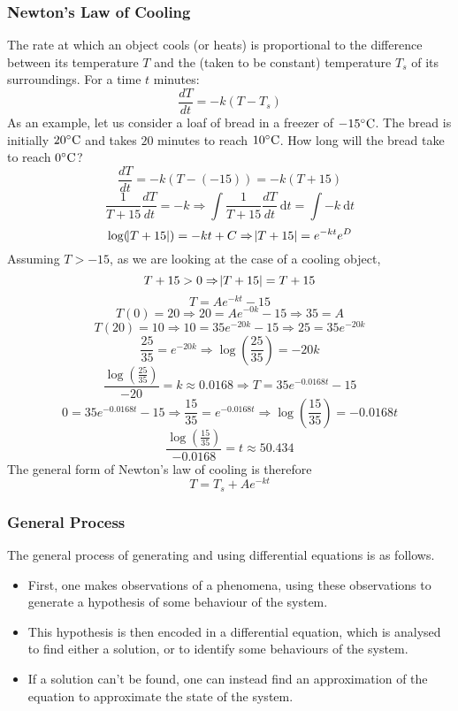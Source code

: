\documentclass[12pt]{report}
\begin{document}
\begin{flushleft}
\subsubsection*{Newton's Law of Cooling}
The rate at which an object cools (or heats) is proportional to the difference
between its temperature \(T\) and the (taken to be constant) temperature 
\(T_s\) of its surroundings. For a time \(t\) minutes:
\[\frac{dT}{dt} = -k(T - T_s)\]
As an example, let us consider a loaf of bread in a freezer of 
\(-15\degree\mathrm{C}\). The bread is initially \(20\degree\mathrm{C}\) and
takes \(20\) minutes to reach \(10\degree\mathrm{C}\). How long will the bread
take to reach \(0\degree\mathrm{C}\)?
\[\frac{dT}{dt} = -k(T - (- 15)) = -k(T + 15)\]
\[\frac{1}{T + 15}\frac{dT}{dt} = -k \Rightarrow 
\int \frac{1}{T + 15}\frac{dT}{dt} \:\mathrm{d}t = \int -k \:\mathrm{d}t\]
\[\log(\abs{T + 15}) = -kt + C \Rightarrow \abs{T + 15} = e^{-kt}e^D\]
Assuming \(T > -15\), as we are looking at the case of a cooling object, 
\[T + 15 > 0 \Rightarrow \abs{T + 15} = T + 15\]
\[T = Ae^{-kt} - 15\]
\[T(0) = 20 \Rightarrow 20 = Ae^{-0k} - 15 \Rightarrow 35 = A\]
\[T(20) = 10 \Rightarrow 10 = 35e^{-20k} - 15 \Rightarrow 25 = 35e^{-20k}\]
\[\frac{25}{35} = e^{-20k} \Rightarrow \log\left(\frac{25}{35}\right) = -20k\]
\[\frac{\log\left(\frac{25}{35}\right)}{-20} = k \approx 0.0168 \Rightarrow
T = 35e^{-0.0168t} - 15\]
\[0 = 35e^{-0.0168t} - 15 \Rightarrow \frac{15}{35} = e^{-0.0168t} \Rightarrow
\log\left(\frac{15}{35}\right) = -0.0168t\]
\[\frac{\log\left(\frac{15}{35}\right)}{-0.0168} = t \approx 50.434\]
The general form of Newton's law of cooling is therefore
\[T = T_s + Ae^{-kt}\]

\subsubsection*{General Process}
The general process of generating and using differential equations is as 
follows.
\begin{itemize}
    \item First, one makes observations of a phenomena, using these
    observations to generate a hypothesis of some behaviour of the system.
    \item This hypothesis is then encoded in a differential equation, which is
    analysed to find either a solution, or to identify some behaviours of the
    system.
    \item If a solution can't be found, one can instead find an approximation
    of the equation to approximate the state of the system.
\end{itemize}

\end{flushleft}
\end{document}
